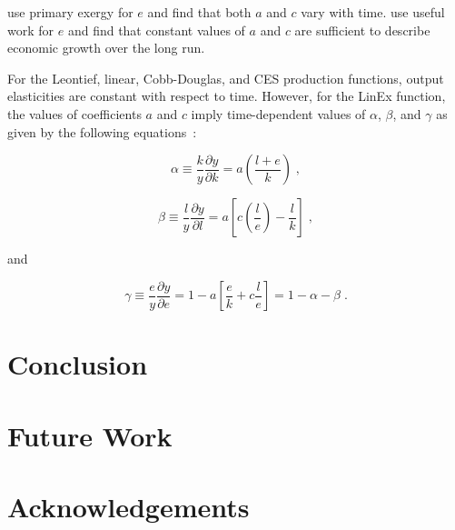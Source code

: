 \documentclass[preprint,authoryear,12pt]{elsarticle}
\begin{document}
\citet{Kummel:2010vz} use primary exergy for $e$ and find that 
both $a$ and $c$ vary with time.
\citet{Warr:2012cg} use useful work for $e$ and find that 
constant values of $a$ and $c$ are sufficient to describe economic growth 
over the long run. 

For the Leontief, linear, Cobb-Douglas, and CES production functions, 
output elasticities are constant with respect to time.
However, for the LinEx function, 
the values of coefficients $a$ and $c$ imply time-dependent
values of $\alpha$, $\beta$, and $\gamma$ as given by the following equations~\citep{Warr:2012cg}:

\begin{equation} \label{eq:LINEX_alpha}
  \alpha \equiv \frac{k}{y}\frac{\partial y}{\partial k} = a \left( \frac{l + e}{k} \right) \;,
\end{equation}

\begin{equation} \label{eq:LINEX_beta}
  \beta \equiv \frac{l}{y} \frac{\partial y}{\partial l} = a \left[ c \left( \frac{l}{e}\right) - \frac{l}{k} \right] \;,
\end{equation}

\noindent{}and

\begin{equation} \label{eq:LINEX_beta_2}
  \gamma \equiv \frac{e}{y} \frac{\partial y}{\partial e} 
         = 1 - a \left[ \frac{e}{k} + c \frac{l}{e} \right] 
         = 1 - \alpha - \beta \;.
\end{equation}


\section{Conclusion}
\label{sec:Conclusion}


\section{Future Work}
\label{sec:FutureWork}




\section*{Acknowledgements}
\label{sec:Acknowledgements}
\end{document}
